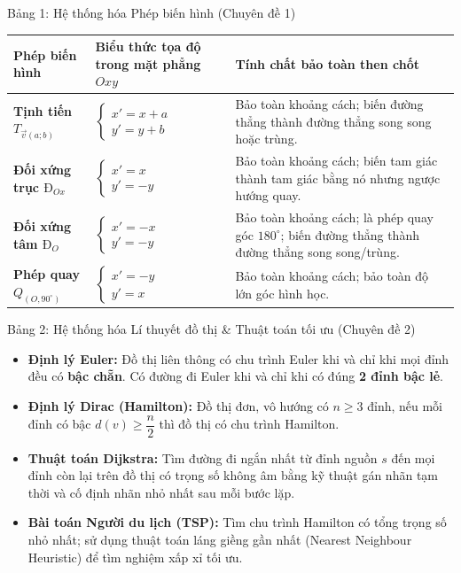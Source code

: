 \documentclass[12pt, a4paper]{article}
\renewcommand{\vec}[1]{\overrightarrow{#1}}
\begin{document}
\begin{pedabox}{Bảng 1: Hệ thống hóa Phép biến hình (Chuyên đề 1)}
\begin{center}
\small
\begin{tabularx}{\linewidth}{|l|X|X|}
\hline
\textbf{Phép biến hình} & \textbf{Biểu thức tọa độ trong mặt phẳng $Oxy$} & \textbf{Tính chất bảo toàn then chốt} \\ \hline
\textbf{Tịnh tiến $T_{\vec{v}(a;b)}$} & $\begin{cases} x' = x + a \\ y' = y + b \end{cases}$ & Bảo toàn khoảng cách; biến đường thẳng thành đường thẳng song song hoặc trùng. \\ \hline
\textbf{Đối xứng trục $Đ_{Ox}$} & $\begin{cases} x' = x \\ y' = -y \end{cases}$ & Bảo toàn khoảng cách; biến tam giác thành tam giác bằng nó nhưng ngược hướng quay. \\ \hline
\textbf{Đối xứng tâm $Đ_O$} & $\begin{cases} x' = -x \\ y' = -y \end{cases}$ & Bảo toàn khoảng cách; là phép quay góc $180^\circ$; biến đường thẳng thành đường thẳng song song/trùng. \\ \hline
\textbf{Phép quay $Q_{(O, 90^\circ)}$} & $\begin{cases} x' = -y \\ y' = x \end{cases}$ & Bảo toàn khoảng cách; bảo toàn độ lớn góc hình học. \\ \hline
\end{tabularx}
\end{center}
\end{pedabox}

\begin{pedabox}{Bảng 2: Hệ thống hóa Lí thuyết đồ thị \& Thuật toán tối ưu (Chuyên đề 2)}
\begin{itemize}[leftmargin=0.5cm]
    \item \textbf{Định lý Euler:} Đồ thị liên thông có chu trình Euler khi và chỉ khi mọi đỉnh đều có \textbf{bậc chẵn}. Có đường đi Euler khi và chỉ khi có đúng \textbf{2 đỉnh bậc lẻ}.
    \item \textbf{Định lý Dirac (Hamilton):} Đồ thị đơn, vô hướng có $n \geq 3$ đỉnh, nếu mỗi đỉnh có bậc $d(v) \geq \dfrac{n}{2}$ thì đồ thị có chu trình Hamilton.
    \item \textbf{Thuật toán Dijkstra:} Tìm đường đi ngắn nhất từ đỉnh nguồn $s$ đến mọi đỉnh còn lại trên đồ thị có trọng số không âm bằng kỹ thuật gán nhãn tạm thời và cố định nhãn nhỏ nhất sau mỗi bước lặp.
    \item \textbf{Bài toán Người du lịch (TSP):} Tìm chu trình Hamilton có tổng trọng số nhỏ nhất; sử dụng thuật toán láng giềng gần nhất (Nearest Neighbour Heuristic) để tìm nghiệm xấp xỉ tối ưu.
\end{itemize}
\end{pedabox}
\end{document}

